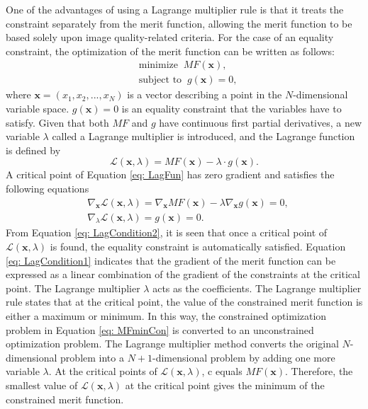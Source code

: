 One of the advantages of using a Lagrange multiplier rule is that it treats  the constraint separately from the merit function, allowing the merit function to be based solely upon image quality-related criteria. For the case of an equality constraint, the optimization of the merit function can be written as follows:
\setlength{\belowdisplayshortskip}{5pt}
\setlength{\abovedisplayshortskip}{5pt}
\begin{equation} \label{eq: MFminCon}
\begin{split}
& \text{minimize}\;\; MF(\textbf{x}), \\
& \text{subject to}\;\; g(\textbf{x}) = 0,
\end{split}
\end{equation}
\noindent where $\textbf{x} = (x_1, x_2, ..., x_N)$ is a vector describing a point in the $N$-dimensional variable space. $g(\textbf{x})=0$ is an equality constraint that the variables have to satisfy. Given that both $MF$ and $g$ have continuous first partial derivatives, a new variable $\lambda$ called a Lagrange multiplier is introduced, and the Lagrange function is defined by
\setlength{\belowdisplayshortskip}{5pt}
\setlength{\abovedisplayshortskip}{5pt}
\begin{equation} \label{eq: LagFun}
\mathcal{L}(\textbf{x},\lambda)=MF(\textbf{x})-\lambda\cdot g(\textbf{x}).
\end{equation}A critical point of Equation \ref{eq: LagFun} has zero gradient and satisfies the following equations
\setlength{\belowdisplayshortskip}{5pt}
\setlength{\abovedisplayshortskip}{5pt}
\begin{subequations} 
\begin{align}
& \nabla_\textbf{x}\mathcal{L}(\textbf{x},\lambda)=\nabla_\textbf{x}MF(\textbf{x})-\lambda\nabla_\textbf{x}g(\textbf{x})=0, \label{eq: LagCondition1} \\
& \nabla_\lambda\mathcal{L}(\textbf{x},\lambda)=g(\textbf{x})=0. \label{eq: LagCondition2}
\end{align}
\end{subequations}
From Equation \ref{eq: LagCondition2}, it is seen that once a critical point of $\mathcal{L}(\textbf{x},\lambda)$ is found, the equality constraint is automatically satisfied. Equation \ref{eq: LagCondition1} indicates that the gradient of the merit function can be expressed as a linear combination of the gradient of the constraints at the critical point. The Lagrange multiplier $\lambda$ acts as the coefficients. The Lagrange multiplier rule states that at the critical point, the value of the constrained merit function is either a maximum or minimum. 
In this way, the constrained optimization problem in Equation \ref{eq: MFminCon} is converted to an unconstrained optimization problem. The Lagrange multiplier method converts the original $N$-dimensional problem into a $N+1$-dimensional problem by adding one more variable $\lambda$.  At the critical points of $\mathcal{L}(\textbf{x},\lambda)$, c  equals $MF(\textbf{x})$. Therefore, the smallest value of $\mathcal{L}(\textbf{x},\lambda)$ at the critical point gives the minimum of the constrained merit function. 

